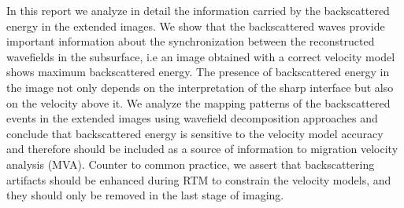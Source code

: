 In this report we analyze in detail the information carried by the backscattered energy in the extended
 images. We show that the backscattered waves provide important information about the 
synchronization between the reconstructed wavefields in the subsurface, i.e an image obtained with a correct velocity model shows maximum backscattered
energy. The presence of backscattered energy in the image not only depends on the interpretation
of the sharp interface but also on the velocity above it. We analyze the mapping patterns of the backscattered
events in the extended images using wavefield decomposition approaches and conclude that backscattered energy
is sensitive to the velocity model accuracy and therefore should be included as a source
of information to migration velocity analysis (MVA). Counter to common practice, we assert that
backscattering artifacts should be enhanced during RTM to constrain the velocity models,
and they should only be removed in the last stage of imaging.



 




